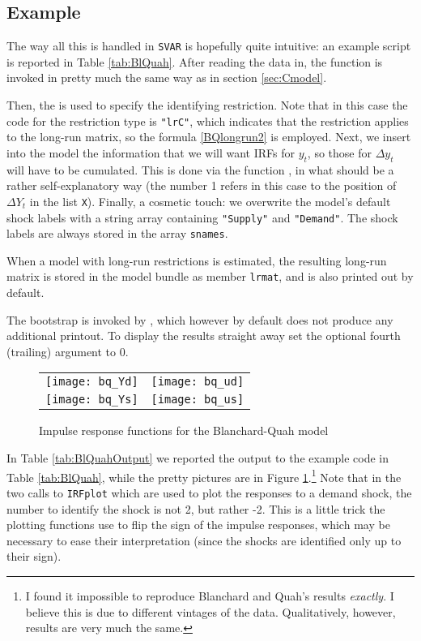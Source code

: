\documentclass[a4paper,10pt]{article}
\newcommand{\dtk}[1]{\texttt{\detokenize{#1}}}
\newcounter{script}[section]
\newlength{\irfw}
\newlength{\irfh}
\begin{document}
\subsection{Example}

The way all this is handled in \texttt{SVAR} is hopefully quite
intuitive: an example script is reported in Table
\ref{tab:BlQuah}. After reading the data in, the function
\dtk{SVAR_setup} is invoked in pretty much the same way as in
section \ref{sec:Cmodel}.

Then, the \dtk{SVAR_restrict} is used to specify the identifying
restriction. Note that in this case the code for the restriction type
is \texttt{"lrC"}, which indicates that the restriction applies to the
long-run matrix, so the formula \eqref{BQlongrun2} is employed. Next,
we insert into the model the information that we will want IRFs for
$y_t$, so those for $\Delta y_t$ will have to be cumulated. This is
done via the function \dtk{SVAR_cumulate()}, in what should be a
rather self-explanatory way (the number 1 refers in this case to the
position of $\Delta Y_t$ in the list \texttt{X}). Finally, a cosmetic
touch: we overwrite the model's default shock labels with a string array 
containing \texttt{"Supply"} and \texttt{"Demand"}. The shock labels
are always stored in the array \texttt{snames}. 

When a model with long-run restrictions is estimated, the resulting 
long-run matrix is stored in the model bundle as member \texttt{lrmat},
and is also printed out by default.

The bootstrap is invoked by \dtk{SVAR_boot}, which however by default
does not produce any additional printout. To display the results 
straight away set the optional fourth (trailing) argument to 0.

\begin{figure}[htbp]
 \centering
  \begin{tabular}{cc}
    \texttt{[image: bq\_Yd]} &
    \texttt{[image: bq\_ud]} \\
    \texttt{[image: bq\_Ys]} &
    \texttt{[image: bq\_us]}
  \end{tabular}
  \caption{Impulse response functions for the Blanchard-Quah model}
  \label{fig:BlQuah}
\end{figure}

In Table \ref{tab:BlQuahOutput} we reported the output to the example
code in Table \ref{tab:BlQuah}, while the pretty pictures are in
Figure \ref{fig:BlQuah}.\footnote{I found it impossible to reproduce
  Blanchard and Quah's results \emph{exactly}. I believe this is due
  to different vintages of the data. Qualitatively, however, results
  are very much the same. } Note that in the two calls to
\texttt{IRFplot} which are used to plot the responses to a demand
shock, the number to identify the shock is not 2, but rather -2. This
is a little trick the plotting functions use to flip the sign of the
impulse responses, which may be necessary to ease their interpretation
(since the shocks are identified only up to their sign).
\end{document}
